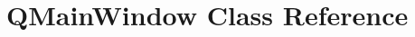 \hypertarget{classGUI_1_1QtGui_1_1QMainWindow}{}\section{Q\+Main\+Window Class Reference}
\label{classGUI_1_1QtGui_1_1QMainWindow}

